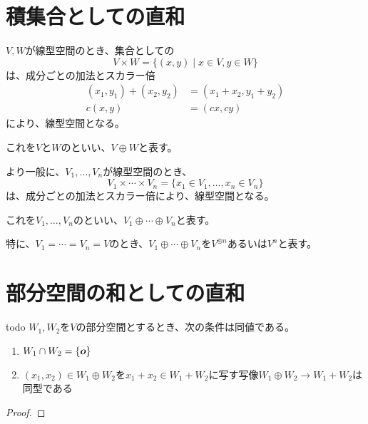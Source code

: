 \documentclass[../../../topic_linear-algebra]{subfiles}
\begin{document}
\sectionline
\section{積集合としての直和}

$V, W$が線型空間のとき、集合としての
\begin{equation*}
  V \times W = \{ (x, y) \mid x \in V, y \in W \}
\end{equation*}
は、成分ごとの加法とスカラー倍
\begin{align*}
  (x_1, y_1) + (x_2, y_2) &= (x_1 + x_2, y_1 + y_2) \\
  c (x, y) &= (c x, c y)
\end{align*}
により、線型空間となる。

これを$V$と$W$のといい、$V \oplus W$と表す。

\br

より一般に、$V_1, \ldots, V_n$が線型空間のとき、
\begin{equation*}
  V_1 \times \cdots \times V_n = \{ x_1 \in V_1, \ldots, x_n \in V_n \}
\end{equation*}
は、成分ごとの加法とスカラー倍により、線型空間となる。

これを$V_1, \ldots, V_n$のといい、$V_1 \oplus \cdots \oplus V_n$と表す。

\br

特に、$V_1 = \cdots = V_n = V$のとき、$V_1 \oplus \cdots \oplus V_n$を$V^{\oplus n}$あるいは$V^n$と表す。

\sectionline
\section{部分空間の和としての直和}

\begin{theorem*}{todo}
  $W_1, W_2$を$V$の部分空間とするとき、次の条件は同値である。
  \begin{enumerate}[label=\romanlabel]
    \item $W_1 \cap W_2 = \{ \vb*{o} \}$
    \item $(x_1, x_2) \in W_1 \oplus W_2$を$x_1 + x_2 \in W_1 + W_2$に写す写像$W_1 \oplus W_2 \to W_1 + W_2$は同型である
  \end{enumerate}
\end{theorem*}

\begin{proof}
\end{proof}
\end{document}
